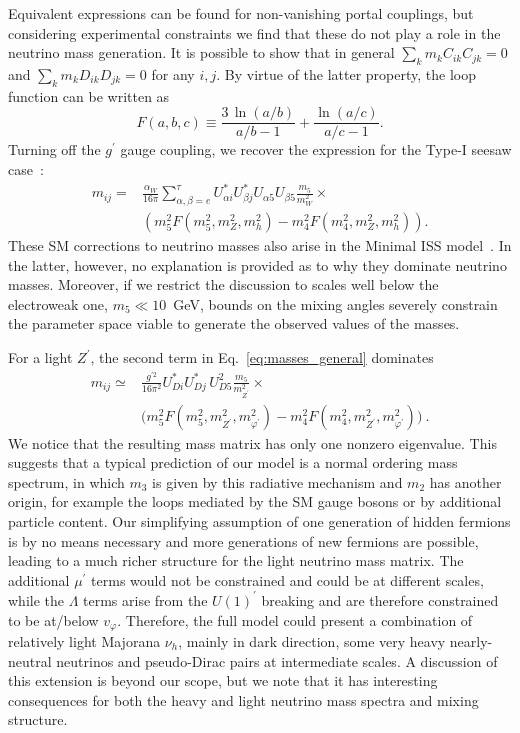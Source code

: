 Equivalent expressions can be found for non-vanishing portal couplings, but considering experimental constraints we find that these do not play a role in the neutrino mass generation. It is possible to show that in general $\sum_{k} m_k C_{ik} C_{jk} =0$ and $\sum_{k} m_k D_{ik} D_{jk} =0$ for any $i,j$. By virtue of the latter property, the loop function can be written as
%
\begin{equation} \label{eq:loop_function}
F(a,b,c) \equiv \frac{3 \, \ln{(a/b)}}{a/b - 1}  + \frac{\ln{(a/c)}}{a/c - 1}.
\end{equation}
%
Turning off the $g^\prime$ gauge coupling, we recover the expression for the Type-I seesaw case~\cite{Pilaftsis:1991ug}:
 \begin{align}  \label{eq:SM_masses}
 m_{ij} = &\frac{\alpha_W}{16\pi}\sum_{\alpha, \beta = e}^{\tau} U_{\alpha i}^\ast U_{\beta j}^\ast  U_{\alpha 5} U_{\beta 5} \frac{m_5}{m_W^2} \times\nonumber\\ & \left( m_5^2 F(m_5^2,m_Z^2,m_h^2) -  m_4^2 F(m_4^2,m_Z^2,m_h^2)\right).
 \end{align}
%
These SM corrections to neutrino masses also arise in the Minimal ISS model~\cite{Dev:2012sg,LopezPavon:2012zg}. In the latter, however, no explanation is provided as to why they dominate neutrino masses. Moreover, if we restrict the discussion to scales well below the electroweak one, $ m_5 \ll 10$~GeV, bounds on the mixing angles severely constrain the parameter space viable to generate the observed values of the masses. 

For a light $Z^\prime$, the second term in Eq.~\ref{eq:masses_general} dominates
%
\begin{align}\label{eq:BSM_masses}
m_{ij} \simeq  &\frac{g^{\prime2}}{16\pi^2} U_{D i}^{*} U_{D j}^{*} \,  U_{D5}^2 \frac{m_5}{m_{Z^\prime}^2} \times\nonumber\\  \quad \quad & \big(m_5^2 F(m_5^2,m_{Z^\prime}^2,m_{\varphi^\prime}^2) - m_4^2 F(m_4^2,m_{Z^\prime}^2,m_{\varphi^\prime}^2)\big)~.
\end{align}
%
We notice that the resulting mass matrix has only one nonzero eigenvalue. This suggests that a typical prediction of our model is a normal ordering mass spectrum, in which $m_3$ is given by this radiative mechanism and $m_2$ has another origin, for example the loops mediated by the SM gauge bosons or by additional particle content. Our simplifying assumption of one generation of hidden fermions is by no means necessary and more generations of new fermions are possible, leading to a much richer structure for the light neutrino mass matrix. The additional $\mu^\prime$ terms would not be constrained and could be at different scales, while the $\Lambda$ terms arise from the $U(1)^\prime$ breaking and are therefore constrained to be at/below $v_\varphi$. Therefore, the full model could present a combination of relatively light Majorana $\nu_h$, mainly in dark direction, some very heavy nearly-neutral neutrinos and pseudo-Dirac pairs at intermediate scales. A discussion of this extension is beyond our scope, but we note that it has interesting consequences for both the heavy and light neutrino mass spectra and mixing structure.

